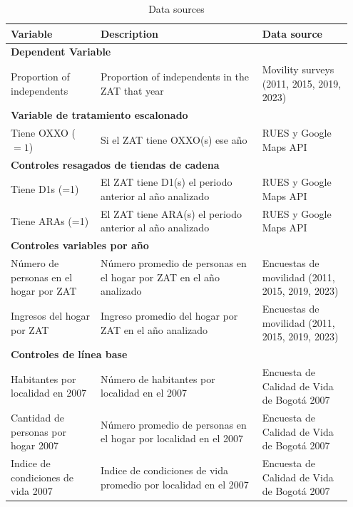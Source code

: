 \documentclass[12pt]{article}
\begin{document}
\begin{longtable}{p{0.25\linewidth} p{0.45\linewidth} p{0.25\linewidth}}
    \caption{Data sources}
    \label{tab:variables_descripcion}
    \\
        \toprule
        \textbf{Variable} & \textbf{Description} & \textbf{Data source} \\
        \midrule
        \endhead
        \midrule
        \multicolumn{3}{l}{\textbf{Dependent Variable}} \\
        \midrule
        Proportion of independents & Proportion of independents in the ZAT that year & Movility surveys (2011, 2015, 2019, 2023) \\
        \midrule
        \multicolumn{3}{l}{\textbf{Variable de tratamiento escalonado}} \\
        \midrule
        Tiene OXXO ($=1$) & Si el ZAT tiene OXXO(s) ese año & RUES y Google Maps API \\
        \midrule
        \multicolumn{3}{l}{\textbf{Controles resagados de tiendas de cadena}} \\
        \midrule
        Tiene D1s (=1) & El ZAT tiene D1(s) el periodo anterior al año analizado & RUES y Google Maps API \\
        \midrule
        Tiene ARAs (=1) & El ZAT tiene ARA(s) el periodo anterior al año analizado & RUES y Google Maps API \\
        \midrule
        \multicolumn{3}{l}{\textbf{Controles variables por año}} \\
        \midrule
        Número de personas en el hogar por ZAT & Número promedio de personas en el hogar por ZAT en el año analizado & Encuestas de movilidad (2011, 2015, 2019, 2023) \\
        \midrule
        Ingresos del hogar por ZAT & Ingreso promedio del hogar por ZAT en el año analizado & Encuestas de movilidad (2011, 2015, 2019, 2023) \\
        \midrule
        \multicolumn{3}{l}{\textbf{Controles de línea base}} \\
        \midrule
        Habitantes por localidad en 2007 & Número de habitantes por localidad en el 2007 & Encuesta de Calidad de Vida de Bogotá 2007 \\
        \midrule
        Cantidad de personas por hogar 2007 & Número promedio de personas en el hogar por localidad en el 2007 & Encuesta de Calidad de Vida de Bogotá 2007 \\
        \midrule
        Indice de condiciones de vida 2007 & Indice de condiciones de vida promedio por localidad en el 2007 & Encuesta de Calidad de Vida de Bogotá 2007 \\

\end{longtable}
\end{document}
